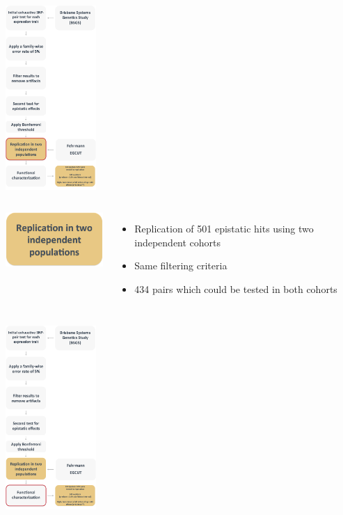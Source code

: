 \documentclass{beamer}
\begin{document}
\begin{frame}
\begin{center}
\includegraphics[height=7cm]{images/methods9.png} \\
\end{center}
\end{frame}

\begin{frame}
\begin{columns}[c]
\includegraphics[width=4.5cm]{images/rep2.png} \\
\begin{itemize}
\item Replication of 501 epistatic hits using two independent cohorts 
\vspace{0.1cm}
\item Same filtering criteria
\vspace{0.1cm}
\item 434 pairs which could be tested in both cohorts 
\end{itemize}
\end{columns}
\end{frame}

\begin{frame}
\begin{center}
\includegraphics[height=7cm]{images/methods10.png} \\
\end{center}
\end{frame}
\end{document}
